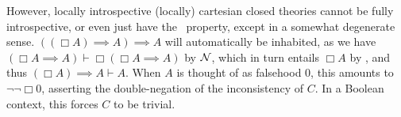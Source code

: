 \documentclass[./main.tex]{subfiles}
\begin{document}
\begin{observation}
However, locally introspective (locally) cartesian closed theories cannot be fully introspective, or even just have the \Loeb\ property, except in a somewhat degenerate sense. $((\Box A) \implies A) \implies A$ will automatically be inhabited, as we have $(\Box A \implies A) \vdash \Box (\Box A \implies A)$ by $\mathcal{N}$, which in turn entails $\Box A$ by \Loeb, and thus $(\Box A) \implies A \vdash A$. When $A$ is thought of as falsehood $0$, this amounts to $\neg \neg \Box 0$, asserting the double-negation of the inconsistency of $C$. In a Boolean context, this forces $C$ to be trivial.

\end{observation}
\end{document}
